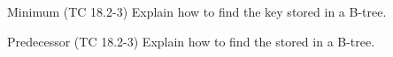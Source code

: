 
\begin{frame}{}
  \begin{exampleblock}{Minimum (TC 18.2-3)}
    Explain how to find the  key stored in a B-tree. 
  \end{exampleblock}


  \pause
  \vspace{0.30cm}
  \begin{center}
  \end{center}
\end{frame}

\begin{frame}{}
  \begin{exampleblock}{Predecessor (TC 18.2-3)}
    Explain how to find the  stored in a B-tree.
  \end{exampleblock}

\end{frame}

\begin{frame}{}
\end{frame}

\begin{frame}{}
\end{frame}

